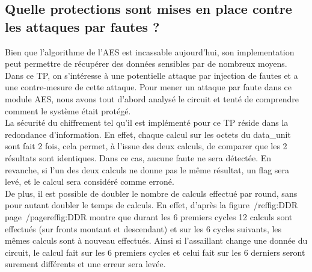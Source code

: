 \subsection{Quelle protections sont mises en place contre les attaques par fautes ?}

Bien que l'algorithme de l'AES est incassable aujourd'hui, son implementation peut permettre de récupérer des données sensibles par de nombreux moyens.
Dans ce TP, on s'intéresse à une potentielle attaque par injection de fautes et a une contre-mesure de cette attaque. 
Pour mener un attaque par faute  dans ce module AES, nous avons tout d'abord analysé le circuit et tenté de comprendre comment le système était protégé.\\

La sécurité du chiffrement tel qu'il est implémenté pour ce TP réside dans la redondance d'information. 
En effet, chaque calcul sur les octets du data_unit sont fait 2 fois, cela permet, à l'issue des deux calculs, de comparer que les 2 résultats sont identiques. 
Dans ce cas, aucune faute ne sera détectée. En revanche, si l'un des deux calculs ne donne pas le même résultat, un flag sera levé, et le calcul sera considéré comme erroné.\\

De plus, il est possible de doubler le nombre de calculs effectué par round, sans pour autant doubler le temps de calculs. 
En effet, d'après la figure~/ref{fig:DDR} page~/pageref{fig:DDR} montre que durant les 6 premiers cycles 12 calculs sont effectués (sur fronts montant et descendant) 
et sur les 6 cycles suivants, les mêmes calculs sont à nouveau effectués. 
Ainsi si l'assaillant change une donnée du circuit, le calcul fait sur les 6 premiers cycles et celui fait sur les 6 derniers seront surement différents et une erreur sera levée.


